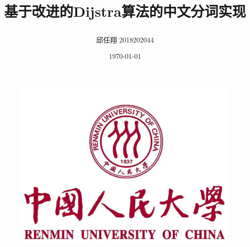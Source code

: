 \documentclass[UTF8]{ctexart}
\begin{document}
\begin{figure}
\centering
\includegraphics[scale = 1.5]{title.jpg}
\end{figure}
\title{ \\ [2ex] \begin{Large} 基于改进的Dijstra算法的中文分词实现 \end{Large} }
\author{邱任翔 2018202044}
\date{\today}
\maketitle
\newpage
\tableofcontents
\listoffigures
\newpage
\end{document}
